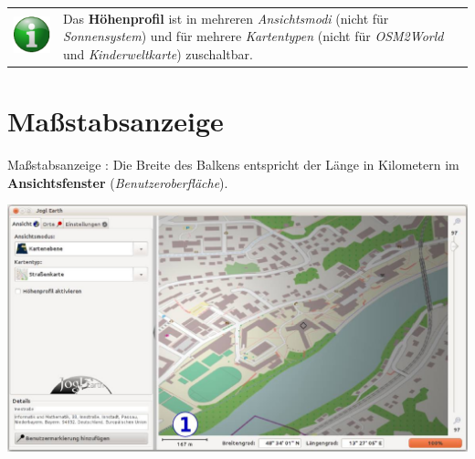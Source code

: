 \documentclass[10pt]{scrreprt}
\newcommand{\textref}[1]{\mbox{\raisebox{0.1ex}{\small$\rightarrow$ }\textit{#1}}}
\begin{document}
\vspace{3mm}
\begin{tabular}{>{\centering \arraybackslash}m{1cm} m{14cm}}
\includegraphics[scale=0.5]{images/info.eps} & Das \textbf{Höhenprofil} ist in mehreren \textref{Ansichtsmodi} (nicht für \textref{Sonnensystem}) und für mehrere \textref{Kartentypen} (nicht für \textref{OSM2World} und \textref{Kinderweltkarte}) zuschaltbar. \\ 
\end{tabular} 




\newpage
\section{Maßstabsanzeige} 
Maßstabsanzeige : Die Breite des Balkens entspricht der Länge in Kilometern im \textbf{Ansichtsfenster} (\textref{Benutzeroberfläche}).

\vspace{3mm}
\begin{center}
\includegraphics[scale=1.95]{images/flacheKarte_massstab.jpg}
\end{center}




\vspace{3mm}
\end{document}
